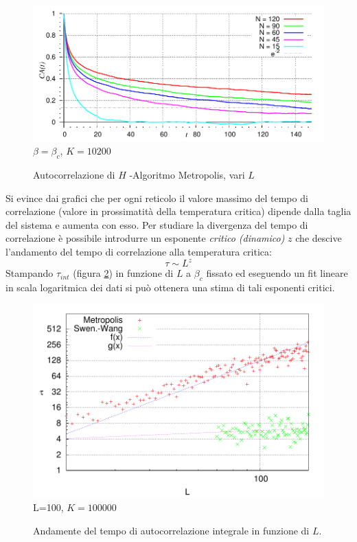 \begin{figure}[!h]
\centering
\caption[ParteB$\_$Tc$\_$TauvsN$\_$Metro.cpp]{Autocorrelazione di $H$ -\footnotesize  Algoritmo Metropolis, vari $L$}\label{fig: Metro_Tc_CAvst}
\includegraphics[scale=0.75]{Immagini/ParteB/Metro_Tc_CAvst}
\newline \footnotesize $\beta = \beta_c$, $K = 10200$
\end{figure}
Si evince dai grafici che per ogni reticolo il valore massimo del tempo di correlazione (valore in prossimatità della temperatura critica) dipende dalla taglia del sistema e aumenta con esso. 
Per studiare la divergenza del tempo di correlazione è possibile introdurre un esponente \emph{critico (dinamico)}\cite{Newman2001} $z$ che descive l'andamento del tempo di correlazione alla temperatura critica:
\begin{equation}
\tau \sim L^z
\end{equation}
Stampando $\tau_{int}$ (figura \ref{fig: Tau_Tc_L}) in funzione di $L$ a $\beta_c$ fissato ed eseguendo un fit lineare in scala logaritmica dei dati si può ottenera una stima di tali esponenti critici.

\begin{figure}[!h]
\centering
\caption[ParteB$\_$Tc$\_$TauvsN.cpp ]{Andamente del tempo di autocorrelazione integrale in funzione di $L$.}\label{fig: Tau_Tc_L}
\includegraphics[scale=0.75]{Immagini/ParteB/TauHvsN}
\newline \footnotesize L=100, $K = 100000$
\end{figure}

